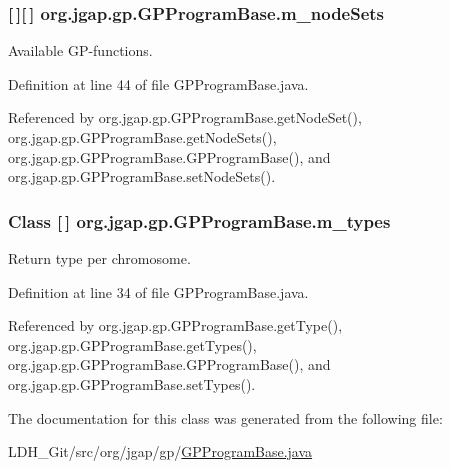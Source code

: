 \hypertarget{classorg_1_1jgap_1_1gp_1_1_g_p_program_base_a4b5f7314b15e61af62db7ac04992776b}{
\subsubsection[{m\-\_\-node\-Sets}]{ \mbox{[}$\,$\mbox{]}\mbox{[}$\,$\mbox{]} org.\-jgap.\-gp.\-G\-P\-Program\-Base.\-m\-\_\-node\-Sets\hspace{0.3cm}{\ttfamily [private]}}}\label{classorg_1_1jgap_1_1gp_1_1_g_p_program_base_a4b5f7314b15e61af62db7ac04992776b}
Available G\-P-\/functions. 

Definition at line 44 of file G\-P\-Program\-Base.\-java.



Referenced by org.\-jgap.\-gp.\-G\-P\-Program\-Base.\-get\-Node\-Set(), org.\-jgap.\-gp.\-G\-P\-Program\-Base.\-get\-Node\-Sets(), org.\-jgap.\-gp.\-G\-P\-Program\-Base.\-G\-P\-Program\-Base(), and org.\-jgap.\-gp.\-G\-P\-Program\-Base.\-set\-Node\-Sets().

\hypertarget{classorg_1_1jgap_1_1gp_1_1_g_p_program_base_aa46237569115e11c220ea2905dee3171}{
\subsubsection[{m\-\_\-types}]{\setlength{\rightskip}{0pt plus 5cm}Class \mbox{[}$\,$\mbox{]} org.\-jgap.\-gp.\-G\-P\-Program\-Base.\-m\-\_\-types\hspace{0.3cm}{\ttfamily [private]}}}\label{classorg_1_1jgap_1_1gp_1_1_g_p_program_base_aa46237569115e11c220ea2905dee3171}
Return type per chromosome. 

Definition at line 34 of file G\-P\-Program\-Base.\-java.



Referenced by org.\-jgap.\-gp.\-G\-P\-Program\-Base.\-get\-Type(), org.\-jgap.\-gp.\-G\-P\-Program\-Base.\-get\-Types(), org.\-jgap.\-gp.\-G\-P\-Program\-Base.\-G\-P\-Program\-Base(), and org.\-jgap.\-gp.\-G\-P\-Program\-Base.\-set\-Types().



The documentation for this class was generated from the following file\-:\begin{DoxyCompactItemize}
\item 
L\-D\-H\-\_\-\-Git/src/org/jgap/gp/\hyperlink{_g_p_program_base_8java}{G\-P\-Program\-Base.\-java}\end{DoxyCompactItemize}
